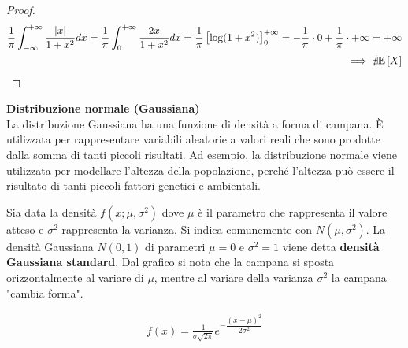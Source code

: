 \begin{defn}
    \begin{proof}
        \begin{equation*}
            \begin{aligned}
                \frac{1}{\pi} \int_{-\infty}^{+\infty} \frac{\lvert x\rvert{}}{1 + x^2} dx = \frac{1}{\pi} \int_{0}^{+\infty} \frac{2x}{1 + x^2} dx =
                \frac{1}{\pi} \left[ \log(1 + x^2) \right]_{0}^{+\infty} = - \frac{1}{\pi} \cdot 0 + \frac{1}{\pi} \cdot +\infty = +\infty \\
                \implies \nexists \mathbb{E}\left[X\right]
            \end{aligned}
        \end{equation*}
    \end{proof}
\end{defn}

\begin{defn}
    \textbf{Distribuzione normale (Gaussiana)} \\
    La distribuzione Gaussiana ha una funzione di densità a forma di campana. È
    utilizzata per rappresentare variabili aleatorie a valori reali che sono
    prodotte dalla somma di tanti piccoli risultati. Ad esempio, la
    distribuzione normale viene utilizzata per modellare l'altezza della
    popolazione, perché l'altezza può essere il risultato di tanti piccoli
    fattori genetici e ambientali.

    Sia data la densità $f(x;\mu, \sigma^2)$ dove $\mu$ è il parametro che
    rappresenta il valore atteso e $\sigma^2$ rappresenta la varianza. Si indica
    comunemente con $N(\mu, \sigma^2)$. La densità Gaussiana $N(0,1)$ di
    parametri $\mu = 0$ e $\sigma^2 = 1$ viene detta \textbf{densità Gaussiana
    standard}. Dal grafico si nota che la campana si sposta orizzontalmente al
    variare di $\mu$, mentre al variare della varianza $\sigma^2$ la campana
    "cambia forma".

    \begin{equation*}
        \begin{aligned}
            f(x) = \frac{1}{\sigma \sqrt{2\pi}} e^{-\dfrac{(x - \mu)^2}{2 \sigma^2}}
        \end{aligned}
    \end{equation*}


    \begin{figure}[htbp!]
        \centering


\end{figure}
\end{defn}
